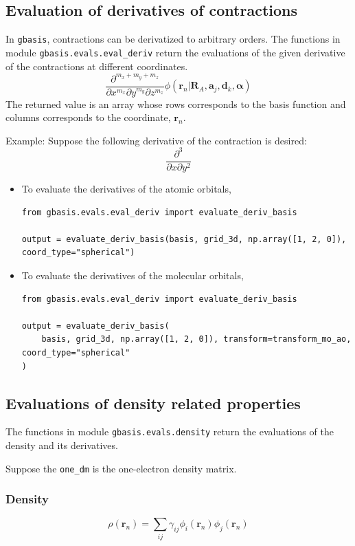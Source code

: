 \documentclass[letterpaper]{article}
\begin{document}
\subsection{Evaluation of derivatives of contractions}
In \verb|gbasis|, contractions can be derivatized to arbitrary orders.
The functions in module \verb|gbasis.evals.eval_deriv| return the evaluations of the
given derivative of the contractions at different coordinates.
\begin{equation}
  \frac{\partial^{m_x + m_y + m_z}}{\partial x^{m_x} \partial y^{m_y} \partial z^{m_z}}
  \phi(\mathbf{r}_n | \mathbf{R}_{A}, \mathbf{a}_j, \mathbf{d}_k, \boldsymbol{\alpha})
\end{equation}
The returned value is an array whose rows corresponds to the basis function and
columns corresponds to the coordinate, $\mathbf{r}_n$.

Example:
Suppose the following derivative of the contraction is desired:
\begin{equation}
  \frac{\partial^3}{\partial x \partial y^2}
\end{equation}
\begin{itemize}
\item To evaluate the derivatives of the atomic orbitals,
  \begin{lstlisting}[xleftmargin=-25pt]
from gbasis.evals.eval_deriv import evaluate_deriv_basis

output = evaluate_deriv_basis(basis, grid_3d, np.array([1, 2, 0]), coord_type="spherical")
\end{lstlisting}
\item To evaluate the derivatives of the molecular orbitals,
  \begin{lstlisting}[xleftmargin=-25pt]
from gbasis.evals.eval_deriv import evaluate_deriv_basis

output = evaluate_deriv_basis(
    basis, grid_3d, np.array([1, 2, 0]), transform=transform_mo_ao, coord_type="spherical"
)
\end{lstlisting}
\end{itemize}
\subsection{Evaluations of density related properties}
The functions in module \verb|gbasis.evals.density| return the evaluations of the
density and its derivatives.

Suppose the \verb|one_dm| is the one-electron density matrix.
\subsubsection{Density}
\begin{equation}
  \rho(\mathbf{r}_n) = \sum_{ij} \gamma_{ij} \phi_i(\mathbf{r}_n) \phi_j(\mathbf{r}_n)
\end{equation}
\end{document}

